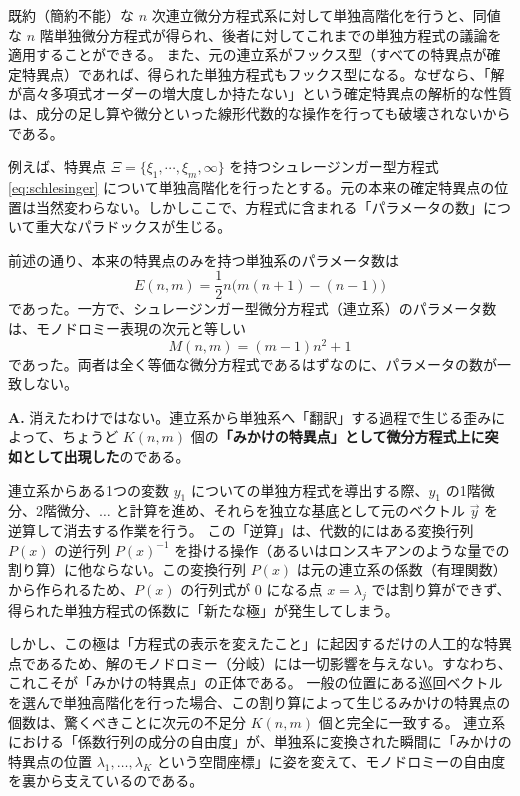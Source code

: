 既約（簡約不能）な $n$ 次連立微分方程式系に対して単独高階化を行うと、同値な $n$ 階単独微分方程式が得られ、後者に対してこれまでの単独方程式の議論を適用することができる。
また、元の連立系がフックス型（すべての特異点が確定特異点）であれば、得られた単独方程式もフックス型になる。なぜなら、「解が高々多項式オーダーの増大度しか持たない」という確定特異点の解析的な性質は、成分の足し算や微分といった線形代数的な操作を行っても破壊されないからである。

例えば、特異点 $\Xi=\{\xi_{1},\cdots,\xi_{m},\infty\}$ を持つシュレージンガー型方程式 \eqref{eq:schlesinger} について単独高階化を行ったとする。元の本来の確定特異点の位置は当然変わらない。しかしここで、方程式に含まれる「パラメータの数」について重大なパラドックスが生じる。

前述の通り、本来の特異点のみを持つ単独系のパラメータ数は
\[
E(n,m) = \frac{1}{2}n \big( m(n+1) - (n-1) \big)
\]
であった。一方で、シュレージンガー型微分方程式（連立系）のパラメータ数は、モノドロミー表現の次元と等しい
\[
M(n,m) = (m-1)n^{2} + 1
\]
であった。両者は全く等価な微分方程式であるはずなのに、パラメータの数が一致しない。

\begin{Q}[【核心】単独高階化を行った結果、$K(n,m) = M(n,m) - E(n,m)$ 個分のパラメータが空中に消え去ってしまったように見える。この「消えたパラメータ」はどこへ行ったのか？]
\textbf{A.} 消えたわけではない。連立系から単独系へ「翻訳」する過程で生じる歪みによって、ちょうど $K(n,m)$ 個の\textbf{「みかけの特異点」として微分方程式上に突如として出現した}のである。

連立系からある1つの変数 $y_1$ についての単独方程式を導出する際、$y_1$ の1階微分、2階微分、$\dots$ と計算を進め、それらを独立な基底として元のベクトル $\vec{y}$ を逆算して消去する作業を行う。
この「逆算」は、代数的にはある変換行列 $P(x)$ の逆行列 $P(x)^{-1}$ を掛ける操作（あるいはロンスキアンのような量での割り算）に他ならない。この変換行列 $P(x)$ は元の連立系の係数（有理関数）から作られるため、$P(x)$ の行列式が $0$ になる点 $x=\lambda_j$ では割り算ができず、得られた単独方程式の係数に「新たな極」が発生してしまう。

しかし、この極は「方程式の表示を変えたこと」に起因するだけの人工的な特異点であるため、解のモノドロミー（分岐）には一切影響を与えない。すなわち、これこそが「みかけの特異点」の正体である。
一般の位置にある巡回ベクトルを選んで単独高階化を行った場合、この割り算によって生じるみかけの特異点の個数は、驚くべきことに次元の不足分 $K(n,m)$ 個と完全に一致する。
連立系における「係数行列の成分の自由度」が、単独系に変換された瞬間に「みかけの特異点の位置 $\lambda_1, \dots, \lambda_K$ という空間座標」に姿を変えて、モノドロミーの自由度を裏から支えているのである。
\end{Q}

